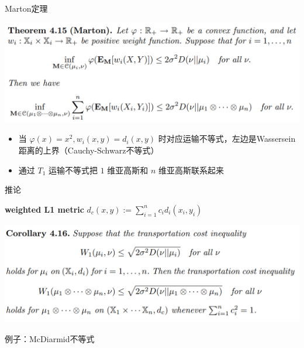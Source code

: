 \documentclass{beamer}
\begin{document}
\begin{frame}{Marton定理}

\begin{center}
\includegraphics[width=1.0\textwidth, frame]{figures/4-15-thm.png}
\end{center}

\begin{itemize}
    \item 当 $\varphi(x)=x^2, w_i(x, y) = d_i(x, y)$ 时对应运输不等式，左边是Wassersein距离的上界（Cauchy-Schwarz不等式）
    \item 通过 $T_1$ 运输不等式把 $1$ 维亚高斯和 $n$ 维亚高斯联系起来
\end{itemize}

\end{frame}

\begin{frame}{推论}

\textbf{weighted L1 metric} $d_c(x, y) := \sum_{i=1}^{n} c_i d_i(x_i, y_i)$

\begin{center}
\includegraphics[width=1.0\textwidth, frame]{figures/4-16-corollary.png}
\end{center}

例子：McDiarmid不等式

\end{frame}
\end{document}

